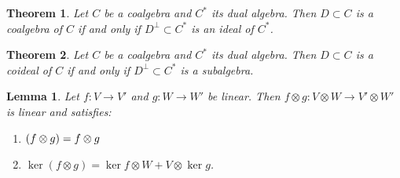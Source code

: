 \documentclass[svgnames]{article}
\newtheorem{Theorem}{Theorem}
\newtheorem{Lemma}{Lemma}
\theoremstyle{definition}
\theoremstyle{remark}
\theoremstyle{underline}
\theoremstyle{underline}
\let\Im\relax
\DeclareMathOperator{\Im}{Im}
\newcommand{\id}{\mathrm{id}}
\begin{document}
	\begin{Theorem}
		Let $C$ be a coalgebra and $C^*$ its dual algebra. Then $D \subset C$ is a coalgebra of $C$ if and only if $D^{\perp} \subset C^*$ is an ideal of $C^*$.
	\end{Theorem}

	\begin{Theorem}
		Let $C$ be a coalgebra and $C^*$ its dual algebra. Then $D \subset C$ is a coideal of $C$ if and only if $D^\perp \subset C^*$ is a subalgebra.
	\end{Theorem}

	\begin{Lemma}
		Let $f \colon V \to V'$ and $g \colon W \to W'$ be linear. Then $f \otimes g \colon V \otimes W \to V' \otimes W'$ is linear and satisfies:
		\begin{enumerate}
			\item $\Im(f \otimes g) = \Im f \otimes \Im g$
			\item $\ker(f \otimes g) = \ker f \otimes W + V \otimes \ker g$.
		\end{enumerate}
	\end{Lemma}


\end{document}
